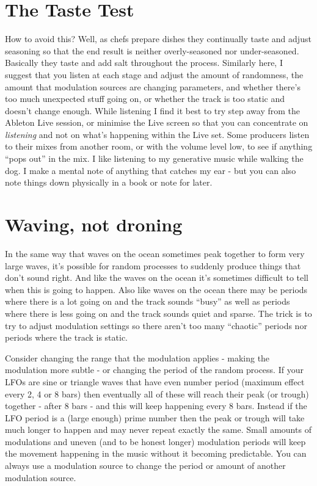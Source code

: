 \documentclass[
  12pt,
  letterpaper,
  oneside,
  open=any]{scrbook}
\begin{document}
\section{The Taste Test}\label{the-taste-test}

How to avoid this? Well, as chefs prepare dishes they continually taste
and adjust seasoning so that the end result is neither overly-seasoned
nor under-seasoned. Basically they taste and add salt throughout the
process. Similarly here, I suggest that you listen at each stage and
adjust the amount of randomness, the amount that modulation sources are
changing parameters, and whether there's too much unexpected stuff going
on, or whether the track is too static and doesn't change enough. While
listening I find it best to try step away from the Ableton Live session,
or minimise the Live screen so that you can concentrate on
\emph{listening} and not on what's happening within the Live set. Some
producers listen to their mixes from another room, or with the volume
level low, to see if anything ``pops out'' in the mix. I like listening
to my generative music while walking the dog. I make a mental note of
anything that catches my ear - but you can also note things down
physically in a book or note for later.

\section{Waving, not droning}\label{waving-not-droning}

In the same way that waves on the ocean sometimes peak together to form
very large waves, it's possible for random processes to suddenly produce
things that don't sound right. And like the waves on the ocean it's
sometimes difficult to tell when this is going to happen. Also like
waves on the ocean there may be periods where there is a lot going on
and the track sounds ``busy'' as well as periods where there is less
going on and the track sounds quiet and sparse. The trick is to try to
adjust modulation settings so there aren't too many ``chaotic'' periods
nor periods where the track is static.

Consider changing the range that the modulation applies - making the
modulation more subtle - or changing the period of the random process.
If your LFOs are sine or triangle waves that have even number period
(maximum effect every 2, 4 or 8 bars) then eventually all of these will
reach their peak (or trough) together - after 8 bars - and this will
keep happening every 8 bars. Instead if the LFO period is a (large
enough) prime number then the peak or trough will take much longer to
happen and may never repeat exactly the same. Small amounts of
modulations and uneven (and to be honest longer) modulation periods will
keep the movement happening in the music without it becoming
predictable. You can always use a modulation source to change the period
or amount of another modulation source.
\end{document}
